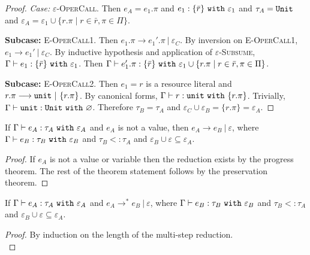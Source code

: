 \begin{appendix}
\begin{proof}
\textit{Case:}  \textsc{$\varepsilon$-OperCall}. Then $e_A = e_1.\pi$ and $e_1: \{ \bar r \}~\mathtt{with}~ \varepsilon_1$ and $\tau_A = \mathtt{Unit}$ and $\varepsilon_A = \varepsilon_1 \cup \{ r.\pi \mid r \in \bar r, \pi \in \Pi \}$.

\textbf{Subcase:} \textsc{E-OperCall1}. Then $e_1.\pi \longrightarrow e_1'.\pi~|~\varepsilon_C$. By inversion on \textsc{E-OperCall1}, $e_1 \longrightarrow e_1'~|~\varepsilon_C$. By inductive hypothesis and application of \textsc{$\varepsilon$-Subsume}, $\Gamma \vdash e_1: \{ \bar r \}~\mathtt{with}~ \varepsilon_1$. Then $\Gamma \vdash e_1'.\pi: \{ \bar r \}~\mathtt{with}~ \varepsilon_1 \cup \{ r.\pi \mid r \in \bar r, \pi \in \Pi \}$.


\textbf{Subcase:} \textsc{E-OperCall2}. Then $e_1 = r$ is a resource literal and $r.\pi \longrightarrow \mathtt{unit}~|~\{ r.\pi \}$. By canonical forms, $ \Gamma \vdash r: \mathtt{unit}~\mathtt{with}~ \{ r.\pi \}$. Trivially, $ \Gamma \vdash \mathtt{unit}: \mathtt{Unit}~\mathtt{with}~ \varnothing$. Therefore $\tau_B = \tau_A$ and $\varepsilon_C \cup \varepsilon_B = \{ r.\pi \} = \varepsilon_A$.
\end{proof}

\hrulefill

\begin{theorem}[Soundness]
If $ \Gamma \vdash  e_A:  \tau_A~\mathtt{with}~ \varepsilon_A$ and $ e_A$ is not a value, then $e_A \longrightarrow e_B~|~\varepsilon$, where $ \Gamma \vdash e_B:  \tau_B~\mathtt{with}~ \varepsilon_B$ and $ \tau_B <:  \tau_A$ and $\varepsilon_B \cup \varepsilon \subseteq \varepsilon_A$.
\end{theorem}
\begin{proof}
If $ e_A$ is not a value or variable then the reduction exists by the progress theorem. The rest of the theorem statement follows by the preservation theorem.
\end{proof}

\hrulefill

\begin{theorem}
If $ \Gamma \vdash  e_A:  \tau_A~\mathtt{with}~ \varepsilon_A$ and $e_A \longrightarrow^{*} e_B~|~\varepsilon$, where $ \Gamma \vdash e_B:  \tau_B~\mathtt{with}~ \varepsilon_B$ and $ \tau_B <:  \tau_A$ and $\varepsilon_B \cup \varepsilon \subseteq \varepsilon_A$.
\end{theorem}

\begin{proof} By induction on the length of the multi-step reduction.\\


\end{proof}
\end{appendix}
